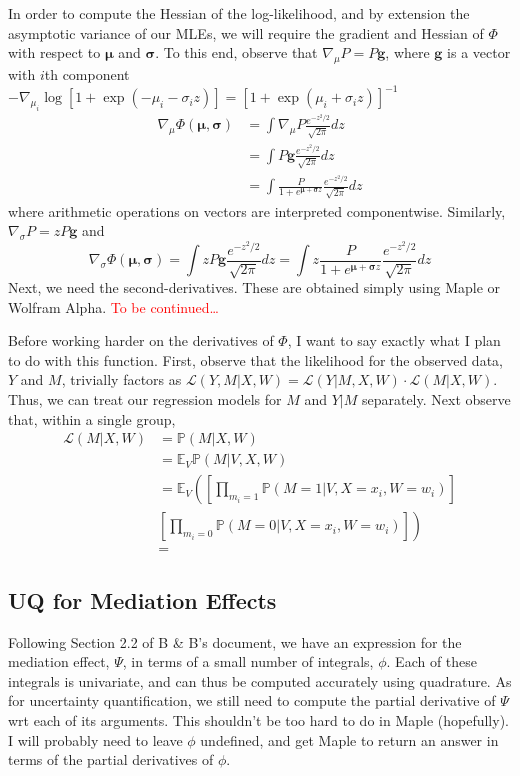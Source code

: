 \documentclass{article}
\newcommand{\bP}{\mathbb{P}}
\newcommand{\bE}{\mathbb{E}}
\newcommand{\zdens}{\frac{e^{-z^2/2}}{\sqrt{2\pi}}}
\begin{document}
In order to compute the Hessian of the log-likelihood, and by extension the asymptotic variance of our MLEs, we will require the gradient and Hessian of $\Phi$ with respect to $\bm{\mu}$ and $\bm{\sigma}$. To this end, observe that $\nabla_\mu P = P \bm{g}$, where $\bm{g}$ is a vector with $i$th component $- \nabla_{\mu_i} \log[1 + \exp(-\mu_i - \sigma_i z)] = [1 + \exp(\mu_i + \sigma_i z)]^{-1}$
%
\begin{align}
    \nabla_{\mu} \Phi(\bm{\mu}, \bm{\sigma}) &= \int \nabla_\mu P \frac{e^{-z^2/2}}{\sqrt{2\pi}} dz\\
    &=  \int P \bm{g} \zdens dz\\
    &= \int \frac{P}{1 + e^{\bm{\mu} + \bm{\sigma}z}} \zdens dz
\end{align}
%
where arithmetic operations on vectors are interpreted componentwise.
Similarly, $\nabla_\sigma P = z P \bm{g}$ and
%
\begin{equation}
    \nabla_{\sigma} \Phi(\bm{\mu}, \bm{\sigma}) = \int z P \bm{g} \zdens dz = \int z \frac{P}{1 + e^{\bm{\mu} + \bm{\sigma}z}} \zdens dz
\end{equation}
%
Next, we need the second-derivatives. These are obtained simply using Maple or Wolfram Alpha. \textcolor{red}{To be continued\ldots}

Before working harder on the derivatives of $\Phi$, I want to say exactly what I plan to do with this function. First, observe that the likelihood for the observed data, $Y$ and $M$, trivially factors as $\mathcal{L}(Y, M | X, W) = \mathcal{L}(Y|M, X, W) \cdot \mathcal{L}(M| X, W)$. Thus, we can treat our regression models for $M$ and $Y|M$ separately. Next observe that, within a single group,
%
\begin{align}
    \mathcal{L}(M| X, W) &= \bP(M| X, W)\\
    &= \bE_V \bP(M | V, X, W)\\
    &= \bE_V \left( \left[ \prod_{m_i = 1} \bP(M=1 |V, X=x_i, W=w_i) \right]\right. \nonumber \\ 
    &\left.\left[ \prod_{m_i = 0} \bP(M=0 |V, X=x_i, W=w_i)\right]\right)\\
    &= 
\end{align}

\subsection{UQ for Mediation Effects}

Following Section 2.2 of B \& B's document, we have an expression for the mediation effect, $\Psi$, in terms of a small number of integrals, $\phi$. Each of these integrals is univariate, and can thus be computed accurately using quadrature. As for uncertainty quantification, we still need to compute the partial derivative of $\Psi$ wrt each of its arguments. This shouldn't be too hard to do in Maple (hopefully). I will probably need to leave $\phi$ undefined, and get Maple to return an answer in terms of the partial derivatives of $\phi$.
\end{document}
